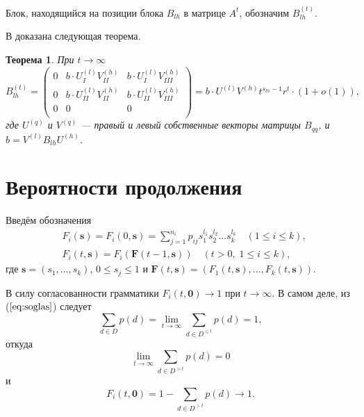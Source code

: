 \documentclass[12pt]{article}
\renewcommand{\leq}{\leqslant}
\newtheorem{theorem}{Теорема}
\begin{document}
{Блок, находящийся на позиции блока $B_{lh}$ в матрице $A^t$, обозначим $B^{(t)}_{lh}$.

В \cite{zhiltsova-about-matrix} доказана следующая теорема.
\begin{theorem}
	При $t \rightarrow \infty$
	\begin{equation*}
		B^{(t)}_{lh} = 
		\begin{pmatrix}
			0 & b \cdot U^{(l)}_I V^{(h)}_{II}    & b \cdot U^{(l)}_I V^{(h)}_{III} \\
			0 & b \cdot U^{(l)}_{II} V^{(h)}_{II} & b \cdot U^{(l)}_{II} V^{(h)}_{III} \\
			0 & 0 & 0 \\
		\end{pmatrix} =
		b \cdot U^{(l)} V^{(h)} t^{s_{lh} - 1} r^t \cdot (1 + o(1)),
	\end{equation*}
	где $U^{(q)}$ и $V^{(q)}$ --- правый и левый собственные векторы матрицы $B_{qq}$, и $b = V^{(l)} B_{lh} U^{(h)}$.
\end{theorem}

\section{Вероятности продолжения}

Введём обозначения
\begin{equation}
\begin{split}
	&F_i(\mathbf{s}) = F_i(0, \mathbf{s}) = \sum_{j = 1}^{n_i} p_{ij} s_1^{l_1} s_2^{l_2} \ldots s_k^{l_k}\quad (1 \leq i \leq k), \\
	&F_i(t, \mathbf{s}) = F_i(\mathbf{F}(t-1, \mathbf{s}))\quad (t > 0,\; 1 \leq i \leq k),
\end{split}
\end{equation}
где $\mathbf{s} = (s_1, \ldots, s_k)$, $0 \leq s_j \leq 1$ и $\mathbf{F}(t, \mathbf{s}) = (F_1(t, \mathbf{s}), \ldots, F_k(t, \mathbf{s}))$.

В силу согласованности грамматики $F_i(t, \mathbf{0}) \rightarrow 1$ при $t \rightarrow \infty$. В самом деле, из ($\ref{eq:soglas}$) следует
\begin{equation*}
	\sum_{d \in D} p(d) = \lim_{t \rightarrow \infty} \sum_{d \in D^{\leq t}} p(d) = 1,
\end{equation*}
откуда
\begin{equation*}
	\lim_{t \rightarrow \infty} \sum_{d \in D^{> t}} p(d) = 0
\end{equation*}
и
\begin{equation*}
\label{eq:Fi-limit}
	F_i(t, \mathbf{0}) = 1 - \sum_{d \in D^{> t}} p(d) \rightarrow 1.
\end{equation*}

}
\end{document}
